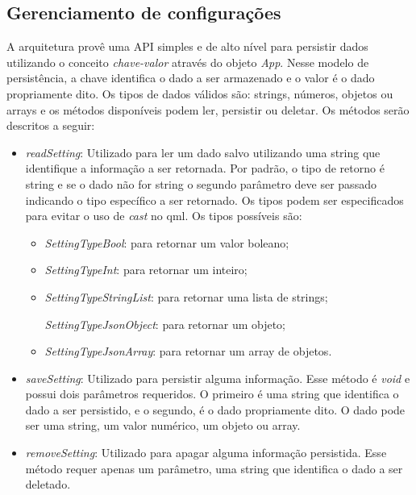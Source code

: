 \subsection{Gerenciamento de configurações}
A arquitetura provê uma API simples e de alto nível para persistir dados utilizando o conceito \textit{chave-valor} através do objeto \textit{App}. Nesse modelo de persistência, a chave identifica o dado a ser armazenado e o valor é o dado propriamente dito. Os tipos de dados válidos são: strings, números, objetos ou arrays e os métodos disponíveis podem ler, persistir ou deletar. Os métodos serão descritos a seguir:
	\begin{itemize}
		\item \textit{readSetting}: Utilizado para ler um dado salvo utilizando uma string que identifique a informação a ser retornada. Por padrão, o tipo de retorno é string e se o dado não for string o segundo parâmetro deve ser passado indicando o tipo específico a ser retornado. Os tipos podem ser especificados para evitar o uso de \textit{cast} no qml. Os tipos possíveis são:
		\begin{itemize}
			\item \textit{SettingTypeBool}: para retornar um valor boleano;

			\item \textit{SettingTypeInt}: para retornar um inteiro;

			\item \textit{SettingTypeStringList}: para retornar uma lista de strings;

			\textit{SettingTypeJsonObject}: para retornar um objeto;

			\item \textit{SettingTypeJsonArray}: para retornar um array de objetos.
		\end{itemize}


		\item \textit{saveSetting}: Utilizado para persistir alguma informação. Esse método é \textit{void} e possui dois parâmetros requeridos. O primeiro é uma string que identifica o dado a ser persistido, e o segundo, é o dado propriamente dito. O dado pode ser uma string, um valor numérico, um objeto ou array.

		\item \textit{removeSetting}: Utilizado para apagar alguma informação persistida. Esse método requer apenas um parâmetro, uma string que identifica o dado a ser deletado.
	\end{itemize}

